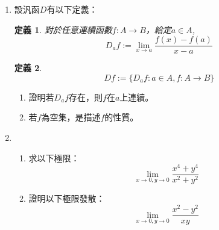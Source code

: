 \documentclass[12pt]{article}
\newtheorem{definition}{定義}
\begin{document}
\begin{enumerate}
\begin{enumerate}
        \end{enumerate}
        \item 設汎函$D$有以下定義：\\
        \begin{definition}
            對於任意連續函數$f:A\to B$，給定$a\in A$, $$D_af:=\lim_{x\to a}\frac{f(x)-f(a)}{x-a}$$
        \end{definition}
        \begin{definition}
            $$Df:=\{D_af:a\in A, f:A\to B\}$$
        \end{definition}
        \begin{enumerate}
            \item 證明若$D_af$存在，則$f$在$a$上連續。
            \item 若$f$為空集，是描述$f$的性質。
        \end{enumerate}
        \item \begin{enumerate}
            \item 求以下極限：$$\lim_{x\to 0,y\to 0}\frac{x^4+y^4}{x^2+y^2}$$
            \item 證明以下極限發散：$$\lim_{x\to 0,y\to 0}\frac{x^2-y^2}{xy}$$
        \end{enumerate}
    \end{enumerate}
\end{document}
